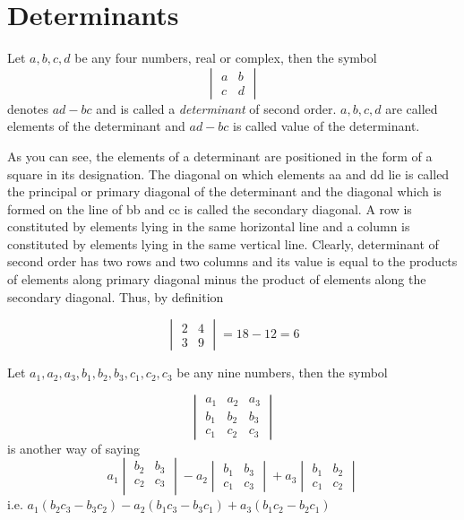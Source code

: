 \chapter{Determinants}
Let $a,b,c,d$ be any four numbers, real or complex, then the symbol $$\begin{vmatrix} a & b \\ c & d\end{vmatrix}$$ denotes $ad
- bc$ and is called a \textit{determinant} of second order. $a,b,c,d$ are called elements of the determinant and $ad - bc$ is
called value of the determinant.

As you can see, the elements of a determinant are positioned in the form of a square in its designation. The diagonal on which
elements aa and dd lie is called the principal or primary diagonal of the determinant and the diagonal which is formed on the line
of bb and cc is called the secondary diagonal. A row is constituted by elements lying in the same horizontal line and a column is
constituted by elements lying in the same vertical line. Clearly, determinant of second order has two rows and two columns and its
value is equal to the products of elements along primary diagonal minus the product of elements along the secondary diagonal. Thus,
by definition

$$\begin{vmatrix}2 & 4\\3 & 9\end{vmatrix} = 18 - 12 = 6$$

Let $a_1, a_2, a_3, b_1, b_2, b_3, c_1, c_2, c_3$ be any nine numbers, then the symbol

$$\begin{vmatrix}a_1 & a_2 & a_3\\b_1 & b_2 & b_3\\c_1 & c_2 & c_3\end{vmatrix}$$
is another way of saying
$$a_1\begin{vmatrix}b_2 & b_3\\c_2 & c_3\\\end{vmatrix} - a_2\begin{vmatrix}b_1 & b_3\\c_1 & c_3\end{vmatrix} + a_3\begin{vmatrix}
b_1 & b_2\\c_1 & c_2\end{vmatrix}$$
i.e. $a_1(b_2c_3 - b_3c_2)-a_2(b_1c_3-b_3c_1) + a_3(b_1c_2-b_2c_1)$


